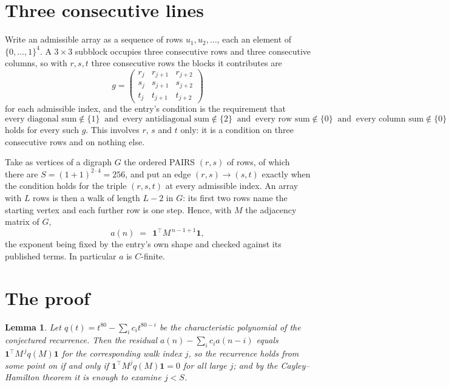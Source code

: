 \documentclass[11pt,a4paper]{article}
\theoremstyle{plain}
\newtheorem{lemma}[theorem]{Lemma}
\theoremstyle{definition}
\begin{document}
\section{Three consecutive lines}

Write an admissible array as a sequence of rows $u_1,u_2,\dots$, each an element of
$\{0,\dots,1\}^{4}$. A $3\times3$ subblock occupies three consecutive rows and
three consecutive columns, so with $r,s,t$ three consecutive rows the blocks it
contributes are
\[
g=\begin{pmatrix}r_j&r_{j+1}&r_{j+2}\\ s_j&s_{j+1}&s_{j+2}\\ t_j&t_{j+1}&t_{j+2}\end{pmatrix}
\]
for each admissible index, and the entry's condition is the requirement that
\[
\text{every diagonal sum} \notin \{1\}\ \text{ and }\ \text{every antidiagonal sum} \notin \{2\}\ \text{ and }\ \text{every row sum} \notin \{0\}\ \text{ and }\ \text{every column sum} \notin \{0\}
\]
holds for every such $g$. This involves $r$, $s$ and $t$ only: it is a condition on
three consecutive rows and on nothing else.

Take as vertices of a digraph $G$ the ordered PAIRS $(r,s)$ of rows, of which there are
$S=(1+1)^{2\cdot4}=256$, and put an edge $(r,s)\to(s,t)$ exactly when the condition
holds for the triple $(r,s,t)$ at every admissible index. An array with $L$ rows is then a
walk of length $L-2$ in $G$: its first two rows name the starting vertex and each further
row is one step. Hence, with $M$ the adjacency matrix of $G$,
\[
a(n)\;=\;\,\mathbf{1}^{\!\top}M^{\,n-1+1}\mathbf{1},
\]
the exponent being fixed by the entry's own shape and checked against its published terms.
In particular $a$ is $C$-finite.

\section{The proof}

\begin{lemma}\label{lem:crit}
Let $q(t)=t^{80}-\sum_i c_it^{80-i}$ be the characteristic polynomial of the
conjectured recurrence. Then the residual $a(n)-\sum_ic_ia(n-i)$ equals
$\mathbf{1}^{\!\top}M^{\,j}q(M)\mathbf{1}$ for the corresponding walk index
$j$, so the recurrence holds from some point on if and only if
$\mathbf{1}^{\!\top}M^{j}q(M)\mathbf{1}=0$ for all large $j$; and by the
Cayley--Hamilton theorem it is enough to examine $j<S$.
\end{lemma}
\end{document}
